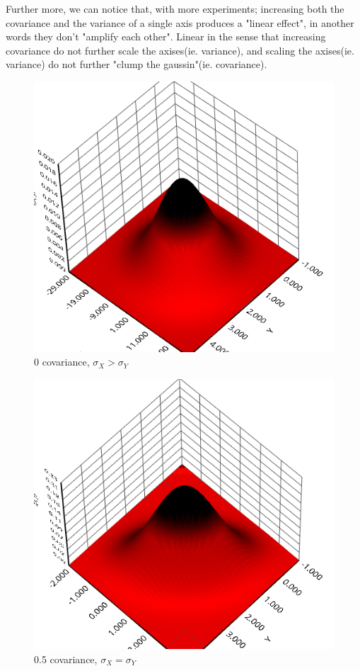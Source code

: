 \documentclass[12pt]{article}
\begin{document}
Further more, we can notice that, with more experiments; increasing both the covariance and the variance of a single axis produces a "linear effect", in another words they don't "amplify each other". Linear in the sense that increasing covariance do not further scale the axises(ie. variance), and scaling the axises(ie. variance) do not further "clump the gaussin"(ie. covariance).

\begin{figure}
  \includegraphics[width=\linewidth]{1.png}
  \caption{ 0 covariance, $\sigma_X > \sigma_Y$}
  \label{fig:boat1}
\end{figure}


\begin{figure}
  \includegraphics[width=\linewidth]{2.png}
  \caption{ 0.5 covariance, $\sigma_X = \sigma_Y$}
  \label{fig:boat2}
\end{figure}
\end{document}
